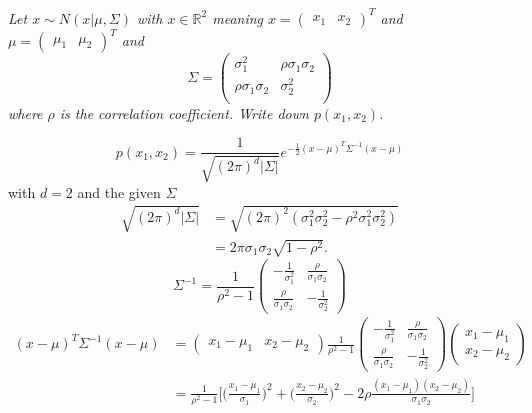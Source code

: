 \begin{example}
	\label{eq:qwe}
	\emph{Let $x\sim N(x|\mu,\Sigma)$ with $x\in \mathbb{R}^2$ meaning $x=\begin{pmatrix}
			x_1 & x_2
		\end{pmatrix}^T$ and $\mu=\begin{pmatrix}
			\mu_1 & \mu_2
		\end{pmatrix}^T$ and }
	\begin{equation}
		\Sigma=\begin{pmatrix}
			\sigma_1^2 &  \rho\sigma_1\sigma_2 \\
			\rho\sigma_1\sigma_2 & \sigma_2^2\\
		\end{pmatrix}
	\end{equation}
	\emph{where $\rho$ is the correlation coefficient. Write down $p(x_1,x_2)$.}
	
	\begin{equation}
		p(x_1,x_2)=\frac{1}{\sqrt{(2\pi)^d|\Sigma|}}e^{-\frac{1}{2}(x-\mu)^T\Sigma^{-1}(x-\mu)}
	\end{equation}
	with $d=2$ and the given $\Sigma$
	\begin{equation}
		\begin{split}
			\sqrt{(2\pi)^d|\Sigma|}&= \sqrt{(2\pi)^2(\sigma_1^2\sigma_2^2-\rho^2\sigma_1^2\sigma_2^2)}\\
			&= 2\pi \sigma_1\sigma_2\sqrt{1-\rho^2}.
		\end{split}
	\end{equation}
	\begin{equation}
		\Sigma^{-1}=\frac{1}{\rho^2-1}\begin{pmatrix}
			-\frac{1}{\sigma_1^2} & \frac{\rho}{\sigma_1\sigma_2}\\
			\frac{\rho}{\sigma_1\sigma_2} & -\frac{1}{\sigma_2^2}
		\end{pmatrix}
	\end{equation}
	\begin{equation}
		\begin{split}
			(x-\mu)^T\Sigma^{-1}(x-\mu) & = \begin{pmatrix}
				x_1-\mu_1 & x_2-\mu_2
			\end{pmatrix}\frac{1}{\rho^2-1}\begin{pmatrix}
				-\frac{1}{\sigma_1^2} & \frac{\rho}{\sigma_1\sigma_2}\\
				\frac{\rho}{\sigma_1\sigma_2} & -\frac{1}{\sigma_2^2}
			\end{pmatrix}\begin{pmatrix}
				x_1-\mu_1 \\ x_2-\mu_2
			\end{pmatrix}\\
			&= \frac{1}{\rho^2-1}\bigg[\bigg(\frac{x_1-\mu_1}{\sigma_1}\bigg)^2+\bigg(\frac{x_2-\mu_2}{\sigma_2}\bigg)^2-2\rho\frac{(x_1-\mu_1)(x_2-\mu_2)}{\sigma_1\sigma_2}\bigg]
		\end{split}
	\end{equation}
\end{example}

